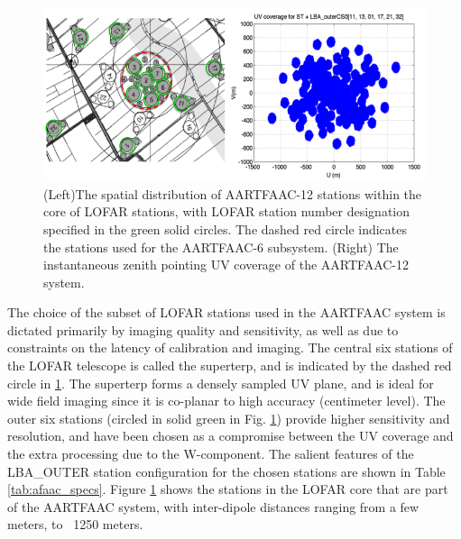 \documentclass{ws-jai}
\begin{document}
\begin{figure}[htbp]
\includegraphics[width=\textwidth]{Figs/A12_config_uvcov/Slide1.png}
\caption{(Left)The spatial distribution of  AARTFAAC-12 stations within the core
  of  LOFAR stations,  with LOFAR  station number  designation specified  in the
  green solid circles. The dashed red circle indicates the stations used for the
  AARTFAAC-6 subsystem. (Right) The instantaneous zenith pointing UV coverage of
  the AARTFAAC-12 system.}
\label{fig:afaac12_arrayconfig}
\end{figure}


The  choice of  the subset  of LOFAR  stations used  in the  AARTFAAC system  is
dictated  primarily by  imaging  quality  and sensitivity,  as  well  as due  to
constraints on the latency of calibration  and imaging. The central six stations
of the LOFAR telescope  is called the superterp, and is  indicated by the dashed
red circle  in \ref  {fig:afaac12_arrayconfig}.  The  superterp forms  a densely
sampled UV plane, and  is ideal for wide field imaging since  it is co-planar to
high  accuracy (centimeter  level).  The  outer six  stations (circled  in solid
green  in Fig.   \ref{fig:afaac12_arrayconfig}) provide  higher sensitivity  and
resolution, and have been chosen as a compromise between the UV coverage and the
extra processing due to the W-component.  The salient features of the LBA\_OUTER
station   configuration   for  the   chosen   stations   are  shown   in   Table
\ref{tab:afaac_specs}.  Figure \ref{fig:afaac12_arrayconfig}  shows the stations
in  the LOFAR  core that  are  part of  the AARTFAAC  system, with  inter-dipole
distances ranging from a few meters, to ~1250 meters.
\end{document}
